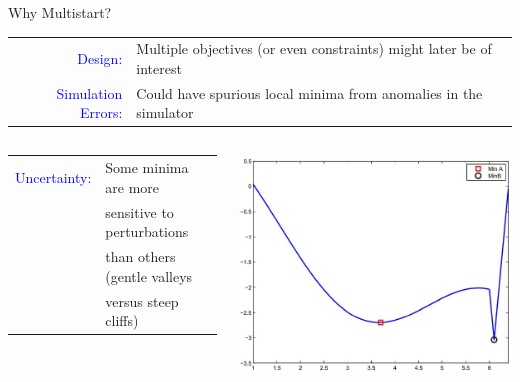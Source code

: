 \documentclass[handout,aspectratio=54]{beamer}
\numberwithin{theorem}{section}
\begin{document}
\begin{frame}{Why Multistart?}
\colorbox[rgb]{0.5,0.6,0.7}{\textcolor{white}{Multiple local minima are often of interest in practice:}}

\begin{table}[]\scriptsize
\begin{tabular}{rl}
\textcolor{blue}{Design: } & Multiple objectives (or even constraints) might later be of interest\\
\textcolor{blue}{Simulation Errors:} & Could have spurious local minima from anomalies in the simulator
\end{tabular}
\end{table}

\begin{columns}
\begin{table}[]\scriptsize
\begin{tabular}{rl}
\textcolor{blue}{Uncertainty: } & Some minima are more \\
&sensitive to perturbations \\
&than others (gentle valleys \\
&versus steep cliffs)
\end{tabular}
\end{table}

\includegraphics[width=\textwidth]{fig/37.jpg}
\end{columns}
\end{frame}
\end{document}
